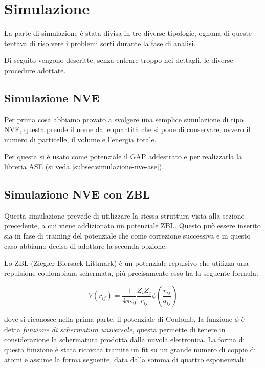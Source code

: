
\section{Simulazione}

La parte di simulazione è stata divisa in tre diverse tipologie, ognuna di queste tentava di risolvere i problemi sorti durante la fase di analisi.

Di seguito vengono descritte, senza entrare troppo nei dettagli, le diverse procedure adottate.

\subsection{Simulazione NVE}

Per prima cosa abbiamo provato a svolgere una semplice simulazione di tipo NVE, questa prende il nome dalle quantità che si pone di conservare, ovvero il numero di particelle, il volume e l'energia totale.

Per questa si è usato come potenziale il GAP addestrato e per realizzarla la libreria ASE (si veda \autoref{subsec:simulazione-nve-ase}).

\subsection{Simulazione NVE con ZBL}

Questa simulazione prevede di utilizzare la stessa struttura vista alla sezione precedente, a cui viene addizionato un potenziale ZBL. Questo può essere inserito sia in fase di training del potenziale che come correzione successiva e in questo caso abbiamo deciso di adottare la seconda opzione. 

Lo ZBL (Ziegler-Biersack-Littmark) è un potenziale repulsivo che utilizza una repulsione coulombiana schermata, più precisamente esso ha la seguente formula:

\begin{equation}
    V(r_{ij}) = \frac{1}{4\pi\epsilon_0}\frac{Z_iZ_j}{r_{ij}} \phi\left(\frac{r_{ij}}{a_{ij}}\right)
\end{equation}

dove si riconosce nella prima parte, il potenziale di Coulomb, la funzione $\phi$ è detta \textit{funzione di schermatura universale}, questa permette di tenere in considerazione la schermatura prodotta dalla nuvola elettronica. La forma di questa funzione è stata ricavata tramite un fit su un grande numero di coppie di atomi e assume la forma seguente, data dalla somma di quattro esponenziali:

